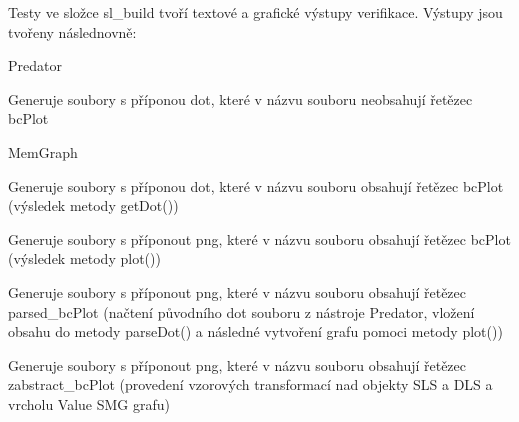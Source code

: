 Testy ve složce sl\+\_\+build tvoří textové a grafické výstupy verifikace. Výstupy jsou tvořeny následnovně\+:

Predator


\begin{DoxyItemize}
\item Generuje soubory s příponou dot, které v názvu souboru neobsahují řetězec bc\+Plot
\end{DoxyItemize}

Mem\+Graph


\begin{DoxyItemize}
\item Generuje soubory s příponou dot, které v názvu souboru obsahují řetězec bc\+Plot (výsledek metody get\+Dot())
\item Generuje soubory s příponout png, které v názvu souboru obsahují řetězec bc\+Plot (výsledek metody plot())
\item Generuje soubory s příponout png, které v názvu souboru obsahují řetězec parsed\+\_\+bc\+Plot (načtení původního dot souboru z nástroje Predator, vložení obsahu do metody parse\+Dot() a následné vytvoření grafu pomoci metody plot())
\item Generuje soubory s příponout png, které v názvu souboru obsahují řetězec zabstract\+\_\+bc\+Plot (provedení vzorových transformací nad objekty S\+LS a D\+LS a vrcholu Value S\+MG grafu) 
\end{DoxyItemize}
